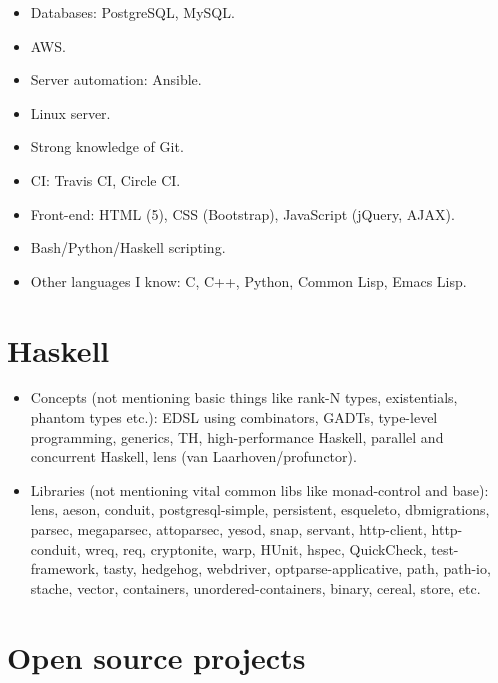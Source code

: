 \documentclass[a4paper,12pt]{article}
\begin{document}
\begin{itemize}[noitemsep]
\item Databases: PostgreSQL, MySQL.
\item AWS.
\item Server automation: Ansible.
\item Linux server.
\item Strong knowledge of Git.
\item CI: Travis CI, Circle CI.
\item Front-end: HTML (5), CSS (Bootstrap), JavaScript (jQuery, AJAX).
\item Bash/Python/Haskell scripting.
\item Other languages I know: C, C++, Python, Common Lisp, Emacs Lisp.
\end{itemize}

\section*{Haskell}

\begin{itemize}[noitemsep]
\item Concepts (not mentioning basic things like rank-N types, existentials,
  phantom types etc.): EDSL using combinators, GADTs, type-level
  programming, generics, TH, high-performance Haskell, parallel and
  concurrent Haskell, lens (van Laarhoven/profunctor).
\item Libraries (not mentioning vital common libs like monad-control and
  base): lens, aeson, conduit, postgresql-simple, persistent, esqueleto,
  dbmigrations, parsec, megaparsec, attoparsec, yesod, snap, servant,
  http-client, http-conduit, wreq, req, cryptonite, warp, HUnit, hspec,
  QuickCheck, test-framework, tasty, hedgehog, webdriver,
  optparse-applicative, path, path-io, stache, vector, containers,
  unordered-containers, binary, cereal, store, etc.
\end{itemize}

\pagebreak

\section*{Open source projects}
\end{document}
